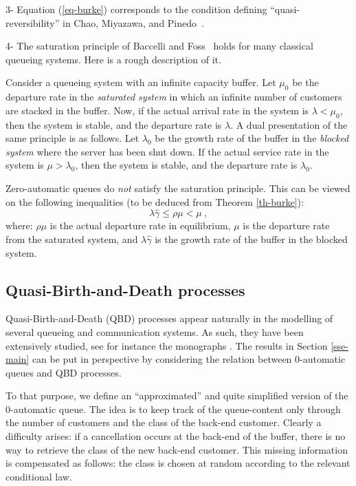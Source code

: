 \documentclass[11pt,a4paper]{article}
\theoremstyle{remark}
\def\eref#1{(\ref{#1})}
\begin{document}
\medskip

3- Equation \eref{eq-burke} corresponds to the condition defining
``quasi-reversibility'' in Chao, Miyazawa, and
Pinedo~\cite[Definition 3.4]{CMPi}. 

\medskip

4- The saturation principle of Baccelli and Foss~\cite{BaFo93b} holds
for many classical queueing systems. Here is a  rough description of
it.

Consider a queueing system with an infinite capacity
buffer.
Let $\mu_0$ be the departure rate in the {\em saturated system} in
which an infinite number of
customers are stacked in the buffer.
Now, if the actual arrival rate in the system is $\lambda<\mu_0$, then the system is
stable, and the departure rate is $\lambda$.
A dual presentation of the same principle is as follows. Let $\lambda_0$
be the growth rate of the buffer in the {\em blocked system} where the server has
been shut down.
If the actual service rate in the system is $\mu > \lambda_0$, then the
system is stable, and the departure rate is $\lambda_0$.

Zero-automatic queues do {\em not} satisfy the saturation principle.
This can be viewed on the following inequalities (to be deduced from
Theorem \ref{th-burke}):
\[
\lambda \widehat{\gamma} \leq \rho \mu < \mu\:,
\]
where: $\rho\mu$ is the actual
 departure rate in equilibrium, $\mu$ is the departure rate from the
 saturated system, and $\lambda\widehat{\gamma}$ is the
 growth rate of the buffer in the blocked system.

\subsection{Quasi-Birth-and-Death processes}

Quasi-Birth-and-Death (QBD) processes appear naturally in the
modelling of several queueing and
communication systems. As such, they have been extensively studied,
see for instance the monographs \cite{LaRa,neut}.
The results in Section \ref{sse-main} can be put in perspective by
considering the relation between 0-automatic queues and QBD
processes.

\medskip

To that purpose, we define an  ``approximated'' and quite
simplified version of the 0-automatic queue. The idea is to keep
track of the queue-content only through the number of customers
and the class of the back-end customer. Clearly a difficulty
arises: if a cancellation occurs at the back-end of the buffer,
there is no way to retrieve the class of the new back-end
customer. This missing information is compensated as follows: the
class is chosen at random according to the relevant conditional
law.
\end{document}
